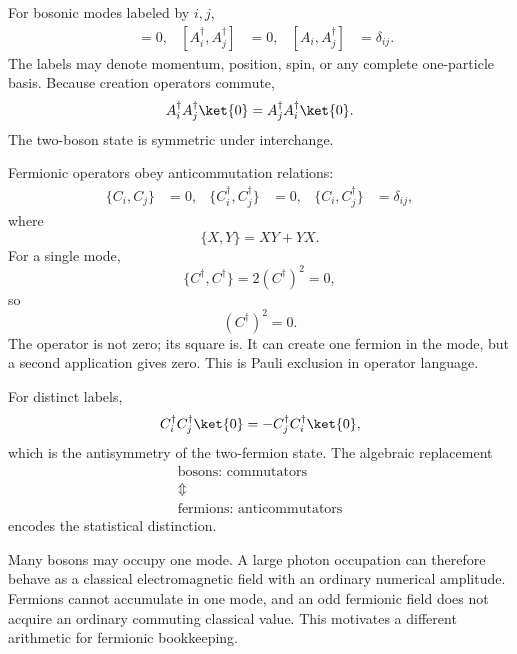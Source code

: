 For bosonic modes labeled by \(i,j\),
\begin{align}
[A_i,A_j]&=0,&
[A_i^\dagger,A_j^\dagger]&=0,&
[A_i,A_j^\dagger]&=\delta_{ij}.
\end{align}
The labels may denote momentum, position, spin, or any complete one-particle basis. Because creation operators commute,
\begin{equation}
A_i^\dagger A_j^\dagger\ket{0}
=A_j^\dagger A_i^\dagger\ket{0}.
\end{equation}
The two-boson state is symmetric under interchange.

Fermionic operators obey anticommutation relations:
\begin{align}
\{C_i,C_j\}&=0,&
\{C_i^\dagger,C_j^\dagger\}&=0,&
\{C_i,C_j^\dagger\}&=\delta_{ij},
\end{align}
where
\begin{equation}
\{X,Y\}=XY+YX.
\end{equation}
For a single mode,
\begin{equation}
\{C^\dagger,C^\dagger\}=2(C^\dagger)^2=0,
\end{equation}
so
\begin{equation}
(C^\dagger)^2=0.
\end{equation}
The operator is not zero; its square is. It can create one fermion in the mode, but a second application gives zero. This is Pauli exclusion in operator language.

For distinct labels,
\begin{equation}
C_i^\dagger C_j^\dagger\ket{0}
=-C_j^\dagger C_i^\dagger\ket{0},
\end{equation}
which is the antisymmetry of the two-fermion state. The algebraic replacement
\begin{equation}
\begin{gathered}
\text{bosons: commutators}\\
\Updownarrow\\
\text{fermions: anticommutators}
\end{gathered}
\end{equation}
encodes the statistical distinction.

Many bosons may occupy one mode. A large photon occupation can therefore behave as a classical electromagnetic field with an ordinary numerical amplitude. Fermions cannot accumulate in one mode, and an odd fermionic field does not acquire an ordinary commuting classical value. This motivates a different arithmetic for fermionic bookkeeping.

